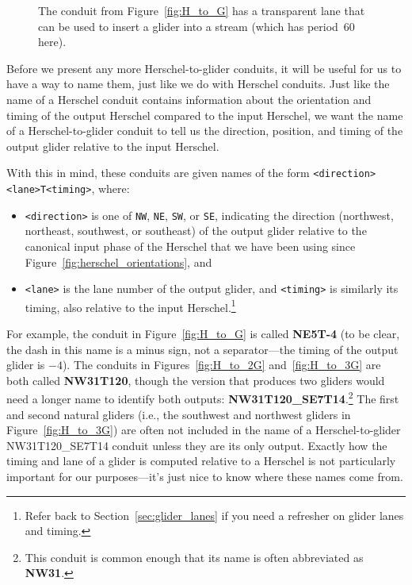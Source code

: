 \begin{figure}[!htb]
	\centering
	\caption{The conduit from Figure~\ref{fig:H_to_G} has a transparent lane that can be used to insert a glider into a stream (which has period~$60$ here).}\label{fig:transparent_lane}
\end{figure}

Before we present any more Herschel-to-glider conduits, it will be useful for us to have a way to name them, just like we do with Herschel conduits. Just like the name of a Herschel conduit contains information about the orientation and timing of the output Herschel compared to the input Herschel, we want the name of a Herschel-to-glider conduit to tell us the direction, position, and timing of the output glider relative to the input Herschel.

With this in mind, these conduits are given names of the form \verb|<direction><lane>T<timing>|, where:\smallskip

\begin{itemize}
	\item \verb|<direction>| is one of \verb|NW|, \verb|NE|, \verb|SW|, or \verb|SE|, indicating the direction (northwest, northeast, southwest, or southeast) of the output glider relative to the canonical input phase of the Herschel that we have been using since Figure~\ref{fig:herschel_orientations}, and\smallskip
	
	\item \verb|<lane>| is the lane number of the output glider, and \verb|<timing>| is similarly its timing, also relative to the input Herschel.\footnote{Refer back to Section~\ref{sec:glider_lanes} if you need a refresher on glider lanes and timing.}\smallskip
\end{itemize}

For example, the conduit in Figure~\ref{fig:H_to_G} is called \textbf{NE5T-4} (to be clear, the dash in this name is a minus sign, not a separator---the timing of the output glider is $-4$). The conduits in Figures~\ref{fig:H_to_2G} and~\ref{fig:H_to_3G} are both called \textbf{NW31T120}, though the version that produces two gliders would need a longer name to identify both outputs: \textbf{NW31T120\_SE7T14}.\footnote{This conduit is common enough that its name is often abbreviated as \textbf{NW31}.} The first and second natural gliders (i.e., the southwest and northwest gliders in Figure~\ref{fig:H_to_3G}) are often not included in the name of a Herschel-to-glider NW31T120\_SE7T14 conduit unless they are its only output. Exactly how the timing and lane of a glider is computed relative to a Herschel is not particularly important for our purposes---it's just nice to know where these names come from.

